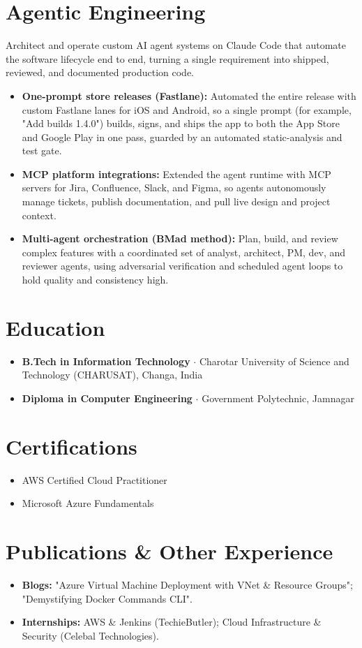 \documentclass[a4paper,10pt]{article}
\begin{document}
\section*{Agentic Engineering}
Architect and operate custom AI agent systems on Claude Code that automate the software lifecycle end to end, turning a single requirement into shipped, reviewed, and documented production code.
\begin{itemize}
  \item \textbf{One-prompt store releases (Fastlane):} Automated the entire release with custom Fastlane lanes for iOS and Android, so a single prompt (for example, "Add builds 1.4.0") builds, signs, and ships the app to both the App Store and Google Play in one pass, guarded by an automated static-analysis and test gate.
  \item \textbf{MCP platform integrations:} Extended the agent runtime with MCP servers for Jira, Confluence, Slack, and Figma, so agents autonomously manage tickets, publish documentation, and pull live design and project context.
  \item \textbf{Multi-agent orchestration (BMad method):} Plan, build, and review complex features with a coordinated set of analyst, architect, PM, dev, and reviewer agents, using adversarial verification and scheduled agent loops to hold quality and consistency high.
\end{itemize}
\section*{Education}
\begin{itemize}
  \item \textbf{B.Tech in Information Technology} $\cdot$ Charotar University of Science and Technology (CHARUSAT), Changa, India
  \item \textbf{Diploma in Computer Engineering} $\cdot$ Government Polytechnic, Jamnagar
\end{itemize}
\section*{Certifications}
\begin{itemize}
  \item AWS Certified Cloud Practitioner
  \item Microsoft Azure Fundamentals
\end{itemize}
\section*{Publications \& Other Experience}
\begin{itemize}
  \item \textbf{Blogs:} "Azure Virtual Machine Deployment with VNet \& Resource Groups"; "Demystifying Docker Commands CLI".
  \item \textbf{Internships:} AWS \& Jenkins (TechieButler); Cloud Infrastructure \& Security (Celebal Technologies).
\end{itemize}
\end{document}

